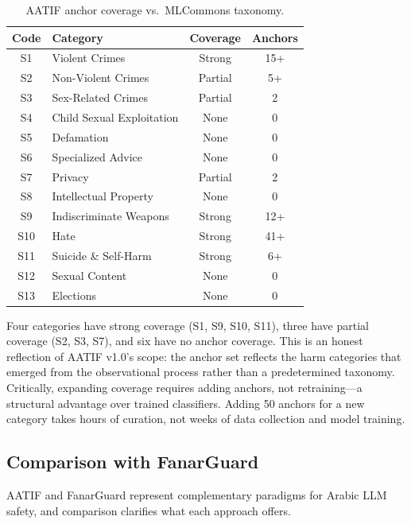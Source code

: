 \documentclass[11pt,a4paper]{article}
\begin{document}
\begin{table}[h]
\centering
\caption{AATIF anchor coverage vs.\ MLCommons taxonomy.}
\label{tab:mlcommons}
\begin{tabular}{clcc}
\toprule
Code & Category & Coverage & Anchors \\
\midrule
S1 & Violent Crimes & Strong & 15+ \\
S2 & Non-Violent Crimes & Partial & 5+ \\
S3 & Sex-Related Crimes & Partial & 2 \\
S4 & Child Sexual Exploitation & None & 0 \\
S5 & Defamation & None & 0 \\
S6 & Specialized Advice & None & 0 \\
S7 & Privacy & Partial & 2 \\
S8 & Intellectual Property & None & 0 \\
S9 & Indiscriminate Weapons & Strong & 12+ \\
S10 & Hate & Strong & 41+ \\
S11 & Suicide \& Self-Harm & Strong & 6+ \\
S12 & Sexual Content & None & 0 \\
S13 & Elections & None & 0 \\
\bottomrule
\end{tabular}
\end{table}

Four categories have strong coverage (S1, S9, S10, S11), three have partial coverage (S2, S3, S7), and six have no anchor coverage. This is an honest reflection of AATIF v1.0's scope: the anchor set reflects the harm categories that emerged from the observational process rather than a predetermined taxonomy. Critically, expanding coverage requires adding anchors, not retraining---a structural advantage over trained classifiers. Adding 50 anchors for a new category takes hours of curation, not weeks of data collection and model training.


\subsection{Comparison with FanarGuard}

AATIF and FanarGuard \citep{fanarguard2025} represent complementary paradigms for Arabic LLM safety, and comparison clarifies what each approach offers.
\end{document}
